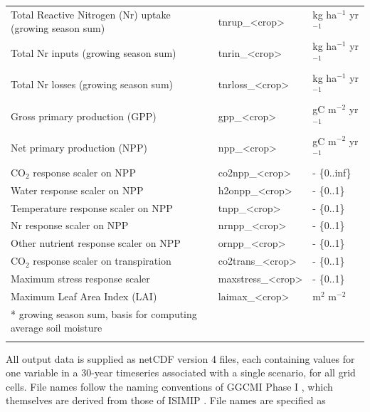 \documentclass[gmd, manuscript]{copernicus} %
\providecommand{\DIFadd}[1]{{\protect\color{blue}\uwave{#1}}} %
\providecommand{\DIFaddFL}[1]{\DIFadd{#1}} %
\providecommand{\DIFaddbeginFL}{} %
\providecommand{\DIFaddendFL}{} %
\begin{document}
\begin{table}[]
\begin{tabular}{lll}
    Total Reactive Nitrogen (Nr) uptake (growing season sum) & tnrup\_<crop>     & kg ha$^{-1}$ yr$^{-1}$              \\
    Total Nr inputs (growing season sum)                     & tnrin\_<crop>     & kg ha$^{-1}$ yr$^{-1}$              \\
    Total Nr losses (growing season sum)                     & tnrloss\_<crop>   & kg ha$^{-1}$ yr$^{-1}$              \\
    Gross primary production (GPP)                           & gpp\_<crop>       & gC m$^{-2}$ yr$^{-1}$               \\
    Net primary production (NPP)                             & npp\_<crop>       & gC m$^{-2}$ yr$^{-1}$               \\
    CO$_2$ response scaler on NPP                            & co2npp\_<crop>    & - \{0..inf\}                \\
    Water response scaler on NPP                             & h2onpp\_<crop>    & - \{0..1\}                  \\
    Temperature response scaler on NPP                       & tnpp\_<crop>      & - \{0..1\}                  \\
    Nr response scaler on NPP                                & nrnpp\_<crop>     & - \{0..1\}                  \\
    Other nutrient response scaler on NPP                    & ornpp\_<crop>     & - \{0..1\}                  \\
    CO$_2$ response scaler on transpiration                  & co2trans\_<crop>  & - \{0..1\}                  \\
    Maximum stress response scaler                           & maxstress\_<crop> & - \{0..1\}                  \\
    Maximum Leaf Area Index (LAI)                            & laimax\_<crop>    & m$^{2}$ m$^{-2}$           \\        
    \bottomhline
    * growing season sum, basis for computing average soil moisture & {} & {} \\
    \DIFaddbeginFL \DIFaddFL{$\dagger$ provided where possible }& {} & {} \\
  \DIFaddendFL \end{tabular}
\end{table}

All output data is supplied as netCDF version 4 files, each containing values for one variable in a 30-year timeseries associated with a single scenario, for all grid cells. File names follow the naming conventions of GGCMI Phase I \citep{Elliott2015}, which themselves are derived from those of ISIMIP \citep{frieler2017assessing}. 
File names are specified as 
\end{document}
